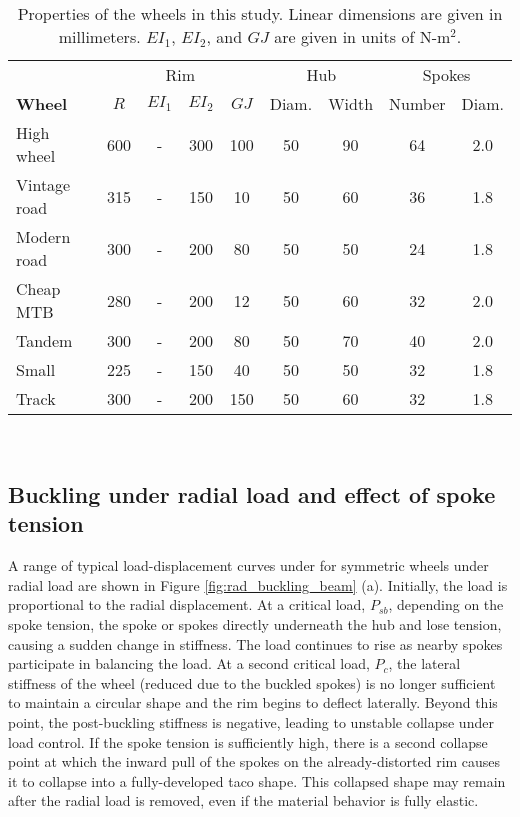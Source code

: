 \documentclass[\rootdir/thesis.tex]{subfiles}
\begin{document}
\begin{table}
\caption{Properties of the wheels in this study. Linear dimensions are given in millimeters. $EI_1$, $EI_2$, and $GJ$ are given in units of N-m$^2$.}
\begin{tabular}{l|cccc|cc|cc}
\hline
&\multicolumn{4}{c|}{Rim} & \multicolumn{2}{c|}{Hub} & \multicolumn{2}{c}{Spokes}\\
\bf{Wheel} & $R$ & $EI_1$ & $EI_2$ & $GJ$ & Diam. & Width & Number & Diam.\\
\hline
High wheel   & 600 & - & 300 & 100 & 50 & 90 & 64 & 2.0\\
Vintage road & 315 & - & 150 & 10  & 50 & 60 & 36 & 1.8\\
Modern road  & 300 & - & 200 & 80  & 50 & 50 & 24 & 1.8\\
Cheap MTB    & 280 & - & 200 & 12  & 50 & 60 & 32 & 2.0\\
Tandem       & 300 & - & 200 & 80  & 50 & 70 & 40 & 2.0\\
Small        & 225 & - & 150 & 40  & 50 & 50 & 32 & 1.8\\
Track        & 300 & - & 200 & 150 & 50 & 60 & 32 & 1.8\\
\hline
\end{tabular}\\
\end{table}



\subsection{Buckling under radial load and effect of spoke tension}

A range of typical load-displacement curves under for symmetric wheels under radial load are shown in Figure \ref{fig:rad_buckling_beam} (a). Initially, the load is proportional to the radial displacement. At a critical load, $P_{sb}$, depending on the spoke tension, the spoke or spokes directly underneath the hub and lose tension, causing a sudden change in stiffness. The load continues to rise as nearby spokes participate in balancing the load. At a second critical load, $P_c$, the lateral stiffness of the wheel (reduced due to the buckled spokes) is no longer sufficient to maintain a circular shape and the rim begins to deflect laterally. Beyond this point, the post-buckling stiffness is negative, leading to unstable collapse under load control. If the spoke tension is sufficiently high, there is a second collapse point at which the inward pull of the spokes on the already-distorted rim causes it to collapse into a fully-developed taco shape. This collapsed shape may remain after the radial load is removed, even if the material behavior is fully elastic.
\end{document}
